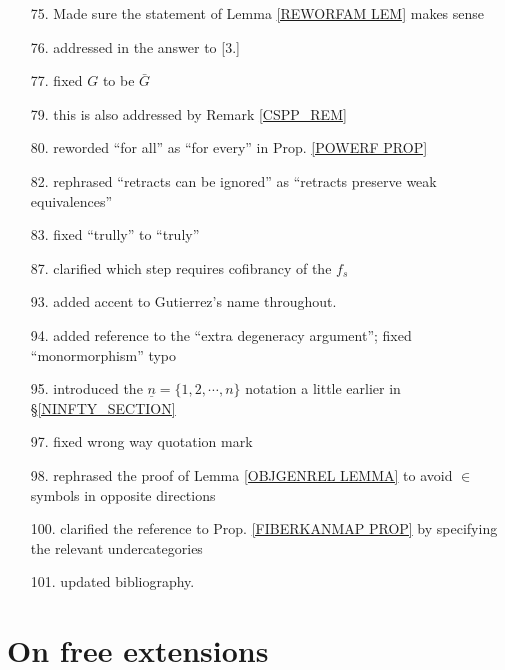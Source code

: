 \documentclass{article}
\begin{document}
\begin{itemize}
\item[75.] Made sure the statement of Lemma \ref{REWORFAM LEM} makes sense

\item[76.] addressed in the answer to [3.]

\item[77.] fixed $G$ to be $\bar{G}$
      
\item[79.] this is also addressed by Remark \ref{CSPP_REM}      
      
\item[80.] reworded ``for all'' as ``for every'' in Prop. \ref{POWERF PROP}

\item[82.] rephrased ``retracts can be ignored''
as ``retracts preserve weak equivalences''

\item[83.] fixed ``trully'' to ``truly''

\item[87.] clarified which step requires cofibrancy of the 
$f_s$

\item[93.] added accent to Gutierrez's name throughout.

\item[94.] added \cite{Ri14} reference to the ``extra degeneracy argument''; fixed ``monormorphism'' typo

\item[95.] introduced the 
$\underline{n} = \{1,2,\cdots,n\}$
notation a little earlier in \S \ref{NINFTY_SECTION}

\item[97.] fixed wrong way quotation mark

\item[98.] rephrased the proof of Lemma \ref{OBJGENREL LEMMA}
to avoid $\in$ symbols in opposite directions

\item[100.] clarified the reference to Prop. \ref{FIBERKANMAP PROP} by specifying the relevant undercategories

\item[101.] updated bibliography.

\end{itemize}




\section{On free extensions}
\end{document}
